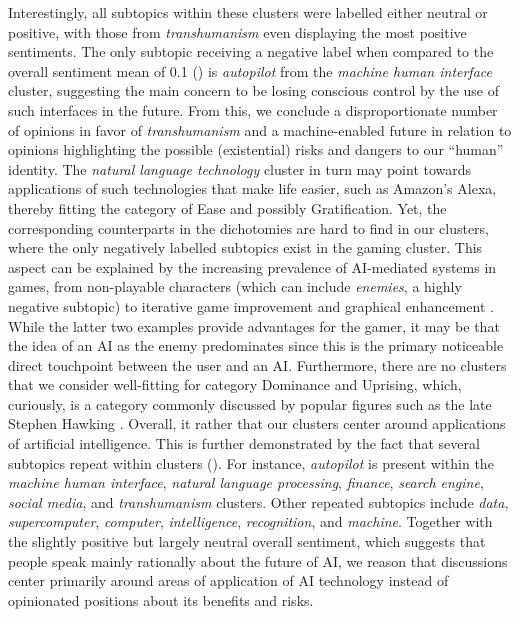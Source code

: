 Interestingly, all subtopics within these clusters were labelled either neutral or positive, with those from \emph{transhumanism} even displaying the most positive sentiments.
The only subtopic receiving a negative label when compared to the overall sentiment mean of 0.1 () is \emph{autopilot} from the \emph{machine human interface} cluster, suggesting the main concern to be losing conscious control by the use of such interfaces in the future.
From this, we conclude a disproportionate number of opinions in favor of \emph{transhumanism} and a machine-enabled future in relation to opinions highlighting the possible (existential) risks and dangers to our ``human'' identity.
The \emph{natural language technology} cluster in turn may point towards applications of such technologies that make life easier, such as Amazon’s Alexa, thereby fitting the category of Ease and possibly Gratification.
Yet, the corresponding counterparts in the dichotomies are hard to find in our clusters, where the only negatively labelled subtopics exist in the gaming cluster.
This aspect can be explained by the increasing prevalence of AI-mediated systems in games, from non-playable characters (which can include \emph{enemies}, a highly negative subtopic) to iterative game improvement and graphical enhancement \citep{anandrise}.
While the latter two examples provide advantages for the gamer, it may be that the idea of an AI as the enemy predominates since this is the primary noticeable direct touchpoint between the user and an AI.
Furthermore, there are no clusters that we consider well-fitting for \citet{cave2019} category Dominance and Uprising, which, curiously, is a category commonly discussed by popular figures such as the late Stephen Hawking \citep{hawking2014transcendence}.
Overall, it rather that our clusters center around applications of artificial intelligence.
This is further demonstrated by the fact that several subtopics repeat within clusters (). For instance, \emph{autopilot} is present within the \emph{machine human interface}, \emph{natural language processing}, \emph{finance}, \emph{search engine}, \emph{social media}, and \emph{transhumanism} clusters.
Other repeated subtopics include \emph{data}, \emph{supercomputer}, \emph{computer}, \emph{intelligence}, \emph{recognition}, and \emph{machine}. Together with the slightly positive but largely neutral overall sentiment, which suggests that people speak mainly rationally about the future of AI, we reason that discussions center primarily around areas of application of AI technology instead of opinionated positions about its benefits and risks.

